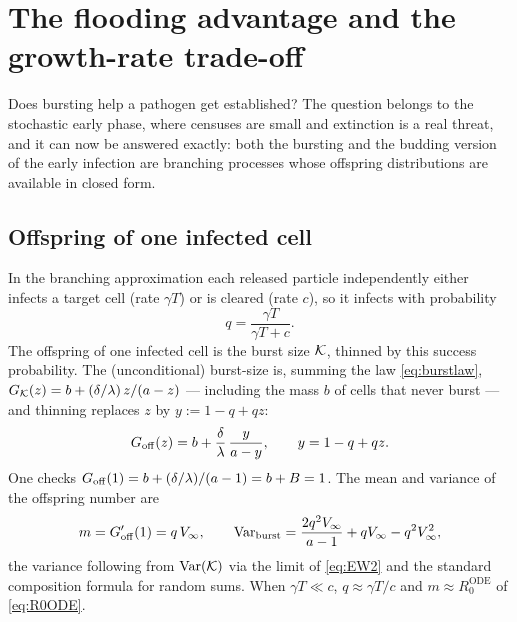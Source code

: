 
\section{The flooding advantage and the growth-rate trade-off}
\label{sec:flooding}

Does bursting help a pathogen get established? The question belongs to the
stochastic early phase, where censuses are small and extinction is a real
threat, and it can now be answered exactly: both the bursting and the
budding version of the early infection are branching processes whose
offspring distributions are available in closed form.

\subsection{Offspring of one infected cell}

In the branching approximation each released particle independently either
infects a target cell (rate $\gamma T$) or is cleared (rate $c$), so it
infects with probability
\begin{equation}
q=\frac{\gamma T}{\gamma T+c}.
\end{equation}
The offspring of one infected cell is the burst size $\mathcal{K}$, thinned by this
success probability. The (unconditional) burst-size \pgf{} is, summing the
law \eqref{eq:burstlaw},
$G_{\mathcal{K}}(z)=b+(\delta/\lambda)\,z/(a-z)$ --- including the mass $b$ of cells
that never burst --- and thinning replaces $z$ by $y:=1-q+qz$:
\begin{equation}
G_{\rm off}(z)=b+\frac{\delta}{\lambda}\,\frac{y}{a-y},
\qquad y=1-q+qz.
\label{eq:Goff}
\end{equation}
One checks $G_{\rm off}(1)=b+(\delta/\lambda)/(a-1)=b+B=1$. The mean and
variance of the offspring number are
\begin{equation}
m=G_{\rm off}'(1)=q\,V_\infty,
\qquad
\mathrm{Var}_{\rm burst}
=\frac{2q^2V_\infty}{a-1}+qV_\infty-q^2V_\infty^2,
\label{eq:offmoments}
\end{equation}
the variance following from $\mathrm{Var}(\mathcal{K})$ via the limit of
\eqref{eq:EW2} and the standard composition formula for random sums. When
$\gamma T\ll c$, $q\approx\gamma T/c$ and $m\approx R_0^{\mathrm{ODE}}$ of
\eqref{eq:R0ODE}.


